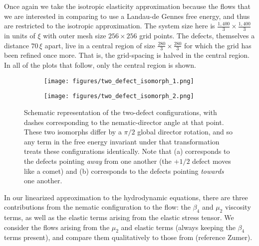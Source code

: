 \documentclass[reqno]{article}
\begin{document}
  Once again we take the isotropic elasticity approximation because the flows
  that we are interested in comparing to use a Landau-de Gennes free energy, and
  thus are restricted to the isotropic approximation.
  The system size here is $\frac{1,400}{3} \times \frac{1,400}{3}$ in units of
  $\xi$ with outer mesh size $256\times 256$ grid points.
  The defects, themselves a distance $70 \, \xi$ apart, live in a central region of
  size $\frac{280}{3} \times \frac{280}{3}$ for which the grid has been refined
  once more.
  That is, the grid-spacing is halved in the central region.
  In all of the plots that follow, only the central region is shown.
  
  \begin{figure}[h]
    \centering
    \begin{subfigure}{0.45\textwidth}
      \texttt{[image: figures/two\_defect\_isomorph\_1.png]}
      \caption{}
      \label{fig:two-defect-isomorph-1}
    \end{subfigure}
    \hfill
    \begin{subfigure}{0.45\textwidth}
      \texttt{[image: figures/two\_defect\_isomorph\_2.png]}
      \caption{}
      \label{fig:two-defect-isomorph-2}
    \end{subfigure}
    \caption{Schematic representation of the two-defect configurations, with
      dashes corresponding to the nematic-director angle at that point. These
      two isomorphs differ by a $\pi/2$ global director rotation, and so any
      term in the free energy invariant under that transformation treats these
      configurations identically. Note that (a) corresponds to the defects
      pointing \textit{away} from one another (the $+1/2$ defect moves like a
      comet) and (b) corresponds to the defects pointing \textit{towards} one another.}
  \end{figure}
  
  In our linearized approximation to the hydrodynamic equations, there are three
  contributions from the nematic configuration to the flow: the $\beta_4$ and
  $\mu_2$ viscosity terms, as well as the elastic terms arising from the elastic
  stress tensor.
  We consider the flows arising from the $\mu_2$ and elastic terms (always
  keeping the $\beta_4$ terms present), and compare them qualitatively to those from
  (reference Zumer).
  
\end{document}
